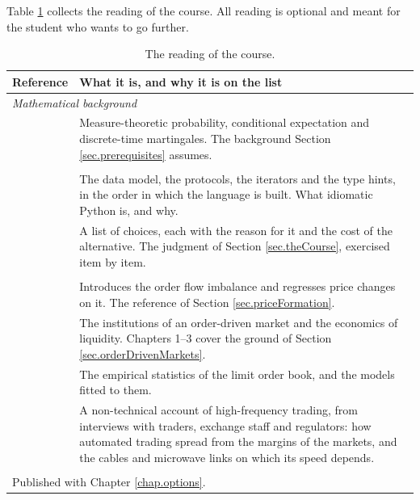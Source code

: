 Table \ref{tab.readingList} collects the reading of the course.
All reading is optional and meant for the student who wants to go further.

\begin{table}[htbp]
 \centering
 \begin{tabular}{p{} p{}}
  \toprule
  Reference & What it is, and why it is on the list \\
  \midrule
  \multicolumn{2}{l}{\emph{Mathematical background}} \\
  \cite{Wil91pro} &
   Measure-theoretic probability, conditional expectation and discrete-time martingales.
   The background Section \ref{sec.prerequisites} assumes. \\
  \addlinespace
  \multicolumn{2}{l}{\emph{Python}} \\
  \cite{Ram22flu} &
   The data model, the protocols, the iterators and the type hints,
   in the order in which the language is built.
   What idiomatic Python is, and why. \\
  \cite{Sla24eff} &
   A list of choices, each with the reason for it and the cost of the alternative.
   The judgment of Section \ref{sec.theCourse}, exercised item by item. \\
  \addlinespace
  \multicolumn{2}{l}{\emph{Market microstructure}} \\
  \cite{CKS14pri} &
   Introduces the order flow imbalance and regresses price changes on it.
   The reference of Section \ref{sec.priceFormation}. \\
  \cite{FPR13mar} &
   The institutions of an order-driven market and the economics of liquidity.
   Chapters 1--3 cover the ground of Section \ref{sec.orderDrivenMarkets}. \\
  \cite{Bou18tra} &
   The empirical statistics of the limit order book, and the models fitted to them. \\
  \cite{Mac21tra} &
   A non-technical account of high-frequency trading,
   from interviews with traders, exchange staff and regulators:
   how automated trading spread from the margins of the markets,
   and the cables and microwave links on which its speed depends. \\
  \addlinespace
  \multicolumn{2}{l}{\emph{Option pricing and volatility trading}} \\
  \multicolumn{2}{l}{Published with Chapter \ref{chap.options}.} \\
  \bottomrule
 \end{tabular}
 \caption{The reading of the course.}
 \label{tab.readingList}
\end{table}
